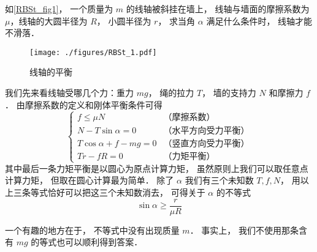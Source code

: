 \begin{example}{}\label{RBSt_ex1}
如\autoref{RBSt_fig1}， 一个质量为 $m$ 的线轴被斜挂在墙上， 线轴与墙面的摩擦系数为 $\mu$，线轴的大圆半径为 $R$， 小圆半径为 $r$， 求当角 $\alpha$ 满足什么条件时， 线轴才能不滑落．
\begin{figure}[ht]
\centering
\texttt{[image: ./figures/RBSt\_1.pdf]}
\caption{线轴的平衡} \label{RBSt_fig1}
\end{figure}

我们先来看线轴受哪几个力：重力 $mg$， 绳的拉力 $T$， 墙的支持力 $N$ 和摩擦力 $f$． 由摩擦系数的定义和刚体平衡条件可得
\begin{equation}
\begin{cases}
f \leqslant \mu N & \text{（摩擦系数）}\\
N - T\sin\alpha = 0 & \text{（水平方向受力平衡）}\\
T\cos\alpha + f - mg = 0 & \text{（竖直方向受力平衡）}\\
Tr - fR = 0 & \text{（力矩平衡）}
\end{cases}
\end{equation}
其中最后一条力矩平衡是以圆心为原点计算力矩， 虽然原则上我们可以取任意点计算力矩， 但取在圆心计算最为简单． 除了 $\alpha$ 我们有三个未知数 $T, f, N$， 用以上三条等式恰好可以把这三个未知数消去， 可得关于 $\alpha$ 的不等式
\begin{equation}
\sin\alpha \geqslant \frac{r}{\mu R}
\end{equation}

一个有趣的地方在于， 不等式中没有出现质量 $m$． 事实上， 我们不使用那条含有 $mg$ 的等式也可以顺利得到答案．
\end{example}
